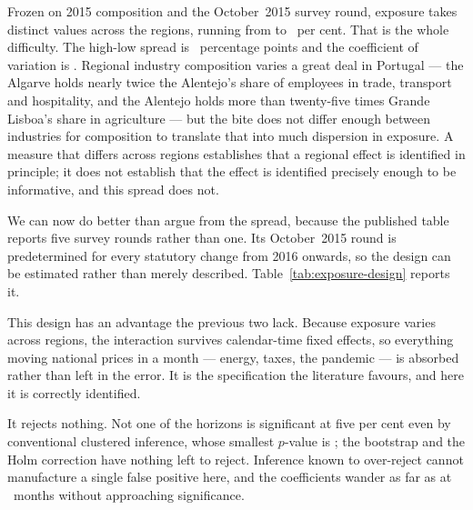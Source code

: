 Frozen on 2015 composition and the October~2015 survey round, exposure takes \ExposureDistinctValues{} distinct
values across the \ExposureRegions{} regions, running from \ExposureMinPct{} to
\ExposureMaxPct{}~per cent. That is the whole difficulty. The high-low spread is
\ExposureSpreadPP{}~percentage points and the coefficient of variation is
\ExposureCV{}. Regional industry composition varies
a great deal in Portugal --- the Algarve holds nearly twice the Alentejo's share
of employees in trade, transport and hospitality, and the Alentejo holds more
than twenty-five times Grande Lisboa's share in agriculture --- but the bite
does not differ enough between industries for composition to translate that into much dispersion
in exposure. A measure that differs across regions establishes that a regional
effect is identified in principle; it does not establish that the effect is
identified precisely enough to be informative, and this spread does not.

We can now do better than argue from the spread, because the published table
reports five survey rounds rather than one. Its October~2015 round is
predetermined for every statutory change from 2016 onwards, so the design can be
estimated rather than merely described. Table~\ref{tab:exposure-design} reports
it.

\begin{table}[htbp]
  \centering
  \caption{Cumulative price response to the statutory change interacted with
  predetermined regional exposure. Exposure is frozen on 2015 composition and
  the October~2015 survey round; the window begins in 2016, so exposure precedes
  every shock. Region-category and calendar-time fixed effects, clustered on
  region. The interval inverts the bootstrap test, as in
  Table~\ref{tab:regional-design}; \ExposureIntervalsBounded{} of these closed
  inside the search.}
  \label{tab:exposure-design}
  
\end{table}

This design has an advantage the previous two lack. Because exposure varies
across regions, the interaction survives calendar-time fixed effects, so
everything moving national prices in a month --- energy, taxes, the pandemic ---
is absorbed rather than left in the error. It is the specification the
literature favours, and here it is correctly identified.

It rejects nothing. Not one of the \ExposureHorizons{} horizons is significant
at five per cent even by conventional clustered inference, whose smallest
$p$-value is \ExposureMinClusteredP{}; the bootstrap and the Holm correction
have nothing left to reject. Inference known to over-reject cannot manufacture a
single false positive here, and the coefficients wander as far as
\ExposureWidestCoefficient{} at \ExposureWidestHorizon{}~months without
approaching significance.

